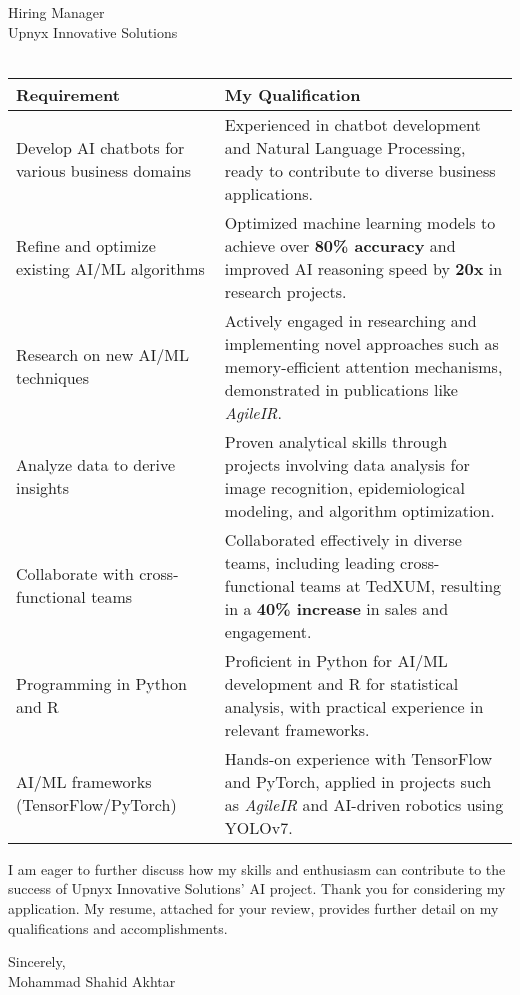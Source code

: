 \documentclass[10.5pt]{letter}
\begin{document}
\begin{letter}{Hiring Manager\\Upnyx Innovative Solutions\\ [Insert Company Address if Known, or Remove Lines]\\}
\renewcommand{\arraystretch}{1.4}
\begin{tabularx}{\textwidth}{@{}p{}X@{}}
\textbf{Requirement} & \textbf{My Qualification} \\
\hline
Develop AI chatbots for various business domains &  Experienced in chatbot development and Natural Language Processing, ready to contribute to diverse business applications. \\
Refine and optimize existing AI/ML algorithms &  Optimized machine learning models to achieve over \textbf{80\% accuracy} and improved AI reasoning speed by \textbf{20x} in research projects. \\
Research on new AI/ML techniques &  Actively engaged in researching and implementing novel approaches such as memory-efficient attention mechanisms, demonstrated in publications like \textit{AgileIR}. \\
Analyze data to derive insights & Proven analytical skills through projects involving data analysis for image recognition, epidemiological modeling, and algorithm optimization. \\
Collaborate with cross-functional teams &  Collaborated effectively in diverse teams, including leading cross-functional teams at TedXUM, resulting in a \textbf{40\% increase} in sales and engagement. \\
Programming in Python and R & Proficient in Python for AI/ML development and R for statistical analysis, with practical experience in relevant frameworks. \\
AI/ML frameworks (TensorFlow/PyTorch) & Hands-on experience with TensorFlow and PyTorch, applied in projects such as \textit{AgileIR} and AI-driven robotics using YOLOv7. \\
\end{tabularx}

\vspace{0.5cm}
I am eager to further discuss how my skills and enthusiasm can contribute to the success of Upnyx Innovative Solutions' AI project. Thank you for considering my application. My resume, attached for your review, provides further detail on my qualifications and accomplishments.

\vspace{0.5cm}

\begin{flushleft}
\vspace{0.3cm}
Sincerely,\\[2ex]
Mohammad Shahid Akhtar
\end{flushleft}

\end{letter}
\end{document}
